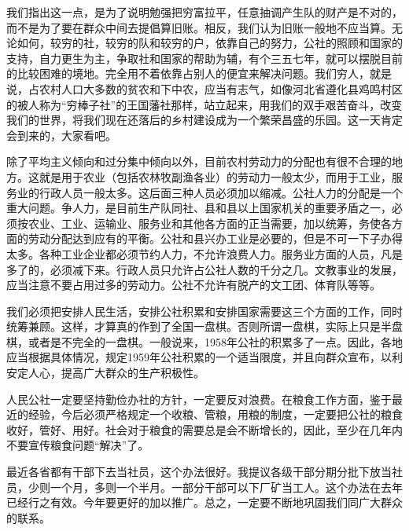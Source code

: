 我们指出这一点，是为了说明勉强把穷富拉平，任意抽调产生队的财产是不对的，而不是为了要在群众中间去提倡算旧账。相反，我们认为旧账一般地不应当算。无论如何，较穷的社，较穷的队和较穷的户，依靠自己的努力，公社的照顾和国家的支持，自力更生为主，争取社和国家的帮助为辅，有个三五七年，就可以摆脱目前的比较困难的境地。完全用不着依靠占别人的便宜来解决问题。我们穷人，就是说，占农村人口大多数的贫农和下中农，应当有志气，如像河北省遵化县鸡鸣村区的被人称为“穷棒子社”的王国藩社那样，站立起来，用我们的双手艰苦奋斗，改变我们的世界，将我们现在还落后的乡村建设成为一个繁荣昌盛的乐园。这一天肯定会到来的，大家看吧。

除了平均主义倾向和过分集中倾向以外，目前农村劳动力的分配也有很不合理的地方。这就是用于农业（包括农林牧副渔各业）的劳动力一般太少，而用于工业，服务业的行政人员一般太多。这后面三种人员必须加以缩减。公社人力的分配是一个重大问题。争人力，是目前生产队同社、县和县以上国家机关的重要矛盾之一，必须按农业、工业、运输业、服务业和其他各方面的正当需要，加以统筹，务使各方面的劳动分配达到应有的平衡。公社和县兴办工业是必要的，但是不可一下子办得太多。各种工业企业都必须节约人力，不允许浪费人力。服务业方面的人员，凡是多了的，必须减下来。行政人员只允许占公社人数的千分之几。文教事业的发展，应当注意不要占用过多的劳动力。公社不允许有脱产的文工团、体育队等等。

我们必须把安排人民生活，安排公社积累和安排国家需要这三个方面的工作，同时统筹兼顾。这样，才算真的作到了全国一盘棋。否则所谓一盘棋，实际上只是半盘棋，或者是不完全的一盘棋。一般说来，1958年公社的积累多了一点。因此，各地应当根据具体情况，规定1959年公社积累的一个适当限度，并且向群众宣布，以利安定人心，提高广大群众的生产积极性。

人民公社一定要坚持勤俭办社的方针，一定要反对浪费。在粮食工作方面，鉴于最近的经验，今后必须严格规定一个收粮、管粮，用粮的制度，一定要把公社的粮食收好，管好、用好。社会对于粮食的需要总是会不断增长的，因此，至少在几年内不要宣传粮食问题“解决”了。

最近各省都有干部下去当社员，这个办法很好。我提议各级干部分期分批下放当社员，少则一个月，多则一个半月。一部分干部可以下厂矿当工人。这个办法在去年已经行之有效。今年要更好的加以推广。总之，一定要不断地巩固我们同广大群众的联系。

